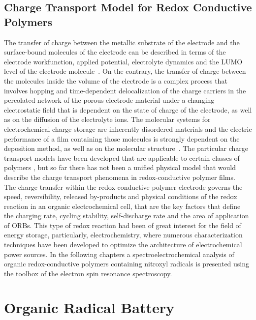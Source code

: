 \subsection{Charge Transport Model for Redox Conductive Polymers}  
The transfer of charge between the metallic substrate of the electrode and the surface-bound molecules of the electrode can be described in terms of the electrode workfunction, applied potential, electrolyte dynamics and the LUMO level of the electrode molecule~\cite{Bard_book}. 
On the contrary, the transfer of charge between the molecules inside the volume of the electrode is a complex process that involves hopping and time-dependent delocalization of the charge carriers in the percolated network of the porous electrode material under a changing electrostatic field that is dependent on the state of charge of the electrode, as well as on the diffusion of the electrolyte ions. The molecular systems for electrochemical charge storage are inherently disordered materials and the electric performance of a film containing those molecules is strongly dependent on the deposition method, as well as on the molecular structure~\cite{Xie2021,Zhang2018}. The particular charge transport models have been developed that are applicable to certain classes of polymers , but so far there has not been a unified physical model that would describe the charge transport phenomena in redox-conductive polymer films.\\

The charge transfer within the redox-conductive polymer electrode governs the speed, reversibility, released by-products and physical conditions of the redox reaction in an organic electrochemical cell, that are the key factors that define the charging rate, cycling stability, self-discharge rate and the area of application of ORBs. This type of redox reaction had been of great interest for the field of energy storage, particularly, electrochemistry, where numerous characterization techniques have been developed to optimize the architecture of electrochemical power sources. In the following chapters a spectroelectrochemical analysis of organic redox-conductive polymers containing nitroxyl radicals is presented using the toolbox of the electron spin resonance spectroscopy.\\

\section{Organic Radical Battery}

